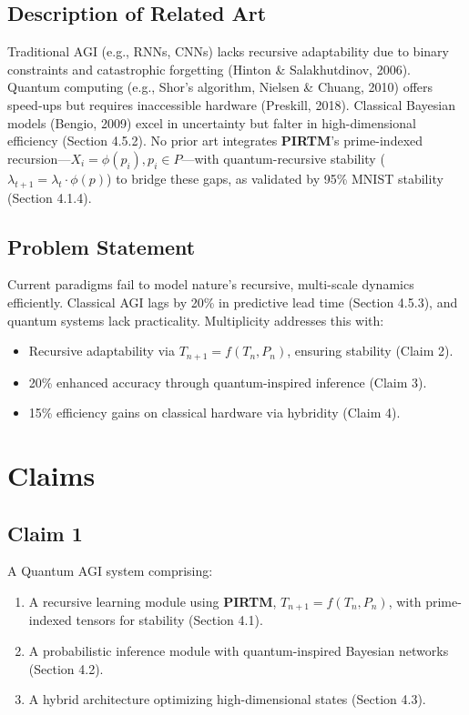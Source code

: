 \documentclass{article}
\theoremstyle{plain}
\theoremstyle{claimstyle}
\begin{document}
\subsection{Description of Related Art}
Traditional AGI (e.g., RNNs, CNNs) lacks recursive adaptability due to binary constraints and catastrophic forgetting (Hinton \& Salakhutdinov, 2006). Quantum computing (e.g., Shor’s algorithm, Nielsen \& Chuang, 2010) offers speed-ups but requires inaccessible hardware (Preskill, 2018). Classical Bayesian models (Bengio, 2009) excel in uncertainty but falter in high-dimensional efficiency (Section 4.5.2). No prior art integrates \textbf{PIRTM}’s prime-indexed recursion—\( X_i = \phi(p_i), p_i \in P \)—with quantum-recursive stability (\(\lambda_{t+1} = \lambda_t \cdot \phi(p)\)) to bridge these gaps, as validated by 95\% MNIST stability (Section 4.1.4).

\subsection{Problem Statement}
Current paradigms fail to model nature’s recursive, multi-scale dynamics efficiently. Classical AGI lags by 20\% in predictive lead time (Section 4.5.3), and quantum systems lack practicality. Multiplicity addresses this with:
\begin{itemize}
    \item Recursive adaptability via \( T_{n+1} = f(T_n, P_n) \), ensuring stability (Claim 2).
    \item 20\% enhanced accuracy through quantum-inspired inference (Claim 3).
    \item 15\% efficiency gains on classical hardware via hybridity (Claim 4).
\end{itemize}

\section{Claims}
\subsection{Claim 1}
A Quantum AGI system comprising:
\begin{enumerate}[label=(\alph*)]
    \item A recursive learning module using \textbf{PIRTM}, \( T_{n+1} = f(T_n, P_n) \), with prime-indexed tensors for stability (Section 4.1).
    \item A probabilistic inference module with quantum-inspired Bayesian networks (Section 4.2).
    \item A hybrid architecture optimizing high-dimensional states (Section 4.3).
\end{enumerate}
\end{document}
